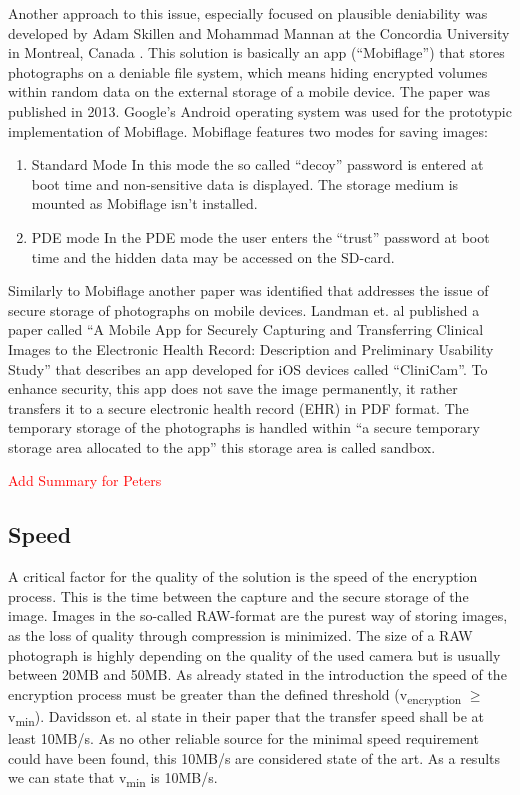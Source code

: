 \documentclass[12pt,a4paper,titlepage,oneside]{scrartcl}
\newcommand\todo[1]{\textcolor{red}{#1}}
\begin{document}
Another approach to this issue, especially focused on plausible deniability was developed by Adam Skillen and Mohammad Mannan at the Concordia University in Montreal, Canada \cite{skillen2013implementing}.
This solution is basically an app (``Mobiflage'') that stores photographs on a deniable file system, which means hiding encrypted volumes within random data on the external storage of a mobile device.
The paper was published in 2013.
Google's Android operating system was used for the prototypic implementation of Mobiflage.
Mobiflage features two modes for saving images: 
\begin{enumerate}
  \item Standard Mode
  In this mode the so called ``decoy'' password is entered at boot time and non-sensitive data is displayed.
  The storage medium is mounted as Mobiflage isn't installed.
  \item PDE mode
  In the PDE mode the user enters the ``trust'' password at boot time and the hidden data may be accessed on the SD-card.
\end{enumerate}

Similarly to Mobiflage another paper was identified that addresses the issue of secure storage of photographs on mobile devices.
Landman et. al \cite{pmid25565678} published a paper called ``A Mobile App for Securely Capturing and Transferring Clinical Images to the Electronic Health Record: Description and Preliminary Usability Study'' that describes an app developed for iOS devices called ``CliniCam''.
To enhance security, this app does not save the image permanently, it rather transfers it to a secure electronic health record (EHR) in PDF format.
The temporary storage of the photographs is handled within ``a secure temporary storage area allocated to the app'' this storage area is called sandbox.

\todo{Add Summary for Peters}

\subsection{Speed}
A critical factor for the quality of the solution is the speed of the encryption process.
This is the time between the capture and the secure storage of the image.
Images in the so-called RAW-format are the purest way of storing images, as the loss of quality through compression is minimized.
The size of a RAW photograph is highly depending on the quality of the used camera but is usually between 20MB and 50MB.
As already stated in the introduction the speed of the encryption process must be greater than the defined threshold (v\textsubscript{encryption} $\geq$ v\textsubscript{min}).
Davidsson et. al \cite{Davidsson2016} state in their paper that the transfer speed shall be at least 10MB/s.
As no other reliable source for the minimal speed requirement could have been found, this 10MB/s are considered state of the art.
As a results we can state that v\textsubscript{min} is 10MB/s.
\end{document}
